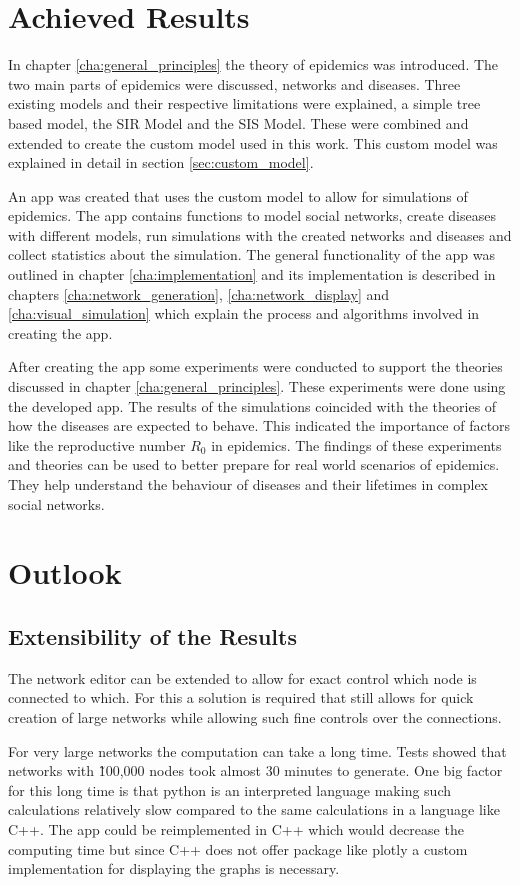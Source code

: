 \section{Achieved Results}
In chapter \ref{cha:general_principles} the theory of epidemics was introduced. The two main parts of epidemics were discussed, networks and diseases. Three existing models and their respective limitations were explained, a simple tree based model, the SIR Model and the SIS Model. These were  combined and extended to create the custom model used in this work. This custom model was explained in detail in section \ref{sec:custom_model}.

An app was created that uses the custom model to allow for simulations of epidemics. The app contains functions to model social networks, create diseases with different models, run simulations with the created networks and diseases and collect statistics about the simulation. The general functionality of the app was outlined in chapter \ref{cha:implementation} and its implementation is described in chapters \ref{cha:network_generation}, \ref{cha:network_display} and \ref{cha:visual_simulation} which explain the process and algorithms involved in creating the app.

After creating the app some experiments were conducted to support the theories discussed in chapter \ref{cha:general_principles}. These experiments were done using the developed app. The results of the simulations coincided with the theories of how the diseases are expected to behave. This indicated the importance of factors like the reproductive number $R_0$ in epidemics. The findings of these experiments and theories can be used to better prepare for real world scenarios of epidemics. They help understand the behaviour of diseases and their lifetimes in complex social networks.

\section{Outlook}
\subsection{Extensibility of the Results}
The network editor can be extended to allow for exact control which node is connected to which. For this a solution is required that still allows for quick creation of large networks while allowing such fine controls over the connections.

For very large networks the computation can take a long time. Tests showed that networks with \~100,000 nodes took almost 30 minutes to generate. One big factor for this long time is that python is an interpreted language making such calculations relatively slow compared to the same calculations in a language like C++. The app could be reimplemented in C++ which would decrease the computing time but since C++ does not offer package like plotly a custom implementation for displaying the graphs is necessary.

